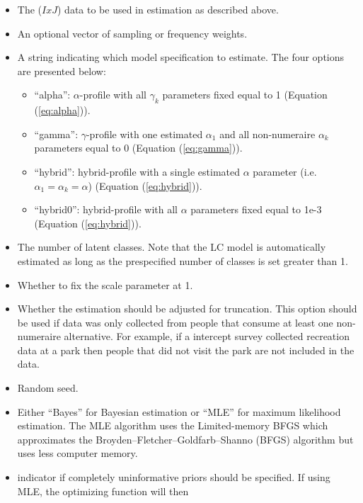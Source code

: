 \begin{itemize}
\item
   The (\(IxJ\)) data to be used in estimation as described
  above.
\item
   An optional vector of sampling or frequency weights.
\item
   A string indicating which model specification to
  estimate. The four options are presented below:

  \begin{itemize}
  \tightlist
  \item
    ``alpha'': \(\alpha\)-profile with all \(\gamma_k\) parameters fixed
    equal to 1 (Equation (\ref{eq:alpha})).
  \item
    ``gamma'': \(\gamma\)-profile with one estimated \(\alpha_1\) and
    all non-numeraire \(\alpha_k\) parameters equal to 0 (Equation
    (\ref{eq:gamma})).
  \item
    ``hybrid'': hybrid-profile with a single estimated \(\alpha\)
    parameter (i.e.~\(\alpha_1 = \alpha_k = \alpha\)) (Equation
    (\ref{eq:hybrid})).
  \item
    ``hybrid0'': hybrid-profile with all \(\alpha\) parameters fixed
    equal to 1e-3 (Equation (\ref{eq:hybrid})).
  \end{itemize}
\item
   The number of latent classes. Note that the LC model
  is automatically estimated as long as the prespecified number of
  classes is set greater than 1.
\item
   Whether to fix the scale parameter at 1.
\item
   Whether the estimation should be adjusted for
  truncation. This option should be used if data was only collected from
  people that consume at least one non-numeraire alternative. For
  example, if a intercept survey collected recreation data at a park
  then people that did not visit the park are not included in the data.
\item
   Random seed.
\item
   Either ``Bayes'' for Bayesian estimation or ``MLE''
  for maximum likelihood estimation. The MLE algorithm uses the
  Limited-memory BFGS which approximates the
  Broyden--Fletcher--Goldfarb--Shanno (BFGS) algorithm but uses less
  computer memory.
\item
   indicator if completely uninformative priors
  should be specified. If using MLE, the optimizing function will then

\end{itemize}

